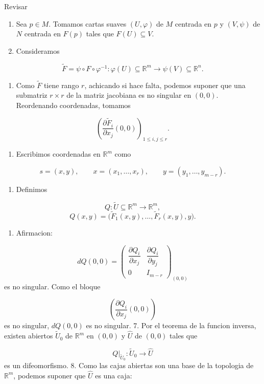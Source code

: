 \begin{bookproof}{Revisar}
\begin{enumerate}
\item Sea $p\in M$. Tomamos cartas suaves $(U,\varphi)$ de $M$ centrada en $p$ y $(V,\psi)$ de $N$ centrada en $F(p)$ tales que $F(U)\subseteq V$.
\item Consideramos
\end{enumerate}
\[
\widetilde F=\psi\circ F\circ\varphi^{-1}:\varphi(U)\subseteq\mathbb R^m\to\psi(V)\subseteq\mathbb R^n.
\]
\begin{enumerate}[start=3]
\item Como $\widetilde F$ tiene rango $r$, achicando si hace falta, podemos suponer que una submatriz $r\times r$ de la matriz jacobiana es no singular en $(0,0)$. Reordenando coordenadas, tomamos
\end{enumerate}
\[
\left(\frac{\partial \widetilde F_i}{\partial x_j}(0,0)\right)_{1\le i,j\le r}.
\]
\begin{enumerate}[start=4]
\item Escribimos coordenadas en $\mathbb R^m$ como
\end{enumerate}
\[
s=(x,y),\qquad x=(x_1,\ldots,x_r),\qquad y=(y_1,\ldots,y_{m-r}).
\]
\begin{enumerate}[start=5]
\item Definimos
\end{enumerate}
\[
Q:\widetilde U\subseteq\mathbb R^m\to\mathbb R^m,
\]
\[
Q(x,y)=\big(\widetilde F_1(x,y),\ldots,\widetilde F_r(x,y),y\big).
\]
\begin{enumerate}[start=6]
\item Afirmacion:
\end{enumerate}
\[
dQ(0,0)=\begin{pmatrix}\dfrac{\partial Q_i}{\partial x_j} & \dfrac{\partial Q_i}{\partial y_j}\\0 & I_{m-r}\end{pmatrix}_{(0,0)}
\]
es no singular. Como el bloque

\[
\left(\frac{\partial Q_i}{\partial x_j}(0,0)\right)
\]
es no singular, $dQ(0,0)$ es no singular. 7. Por el teorema de la funcion inversa, existen abiertos $\widetilde U_0$ de $\mathbb R^m$ en $(0,0)$ y $\widehat U$ de $(0,0)$ tales que

\[
Q|_{\widetilde U_0}:\widetilde U_0\to \widehat U
\]
es un difeomorfismo. 8. Como las cajas abiertas son una base de la topologia de $\mathbb R^m$, podemos suponer que $\widehat U$ es una caja:


\end{bookproof}
